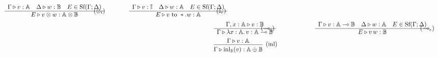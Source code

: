 \begin{figure} [H]
{\begin{equation*}
\begin{split}
\begin{aligned}
\begin{minipage}[t]{0.3\textwidth}
$\begin{array}{c}
     \Gamma \triangleright v: \mathbb{A} \quad  \Delta \triangleright w: \mathbb{B}  \quad E \in \text{Sf}(\Gamma;\Delta) \\
    \hline
   E \triangleright v \otimes w: \mathbb{A} \otimes \mathbb{B} 
\end{array}
$
\end{minipage}
\hspace{41pt} (\otimes_{i}) 
 \hspace{39pt}
 \begin{minipage}[t]{0.3\textwidth}
$\begin{array}{c}
     \Gamma \triangleright v: \mathbb{I} \quad  \Delta \triangleright w: \mathbb{A}  \quad E \in \text{Sf}(\Gamma;\Delta)  \\
    \hline
   E \triangleright v \text { to } *.w: \mathbb{A}  
\end{array}
$ \end{minipage}
\hspace{38pt} (\mathbb{I}_{e}) \\
& \hspace{-20pt}
\begin{minipage}[t]{0.3\textwidth}
$\begin{array}{c}
     \Gamma,x:\mathbb{A} \triangleright v: \mathbb{B} \\
    \hline
   \Gamma \triangleright \lambda x:\mathbb{A} . \, v: \mathbb{A} \multimap \mathbb{B} 
\end{array}
$
\end{minipage}
\hspace{-27pt} (\multimap_{i}) 
 \hspace{66pt}
 \begin{minipage}[t]{0.3\textwidth}
$\begin{array}{c}
     \Gamma \triangleright v: \mathbb{A} \multimap \mathbb{B} \quad  \Delta \triangleright w: \mathbb{A}  \quad E \in \text{Sf}(\Gamma;\Delta)  \\
    \hline
   E \triangleright v \, w: \mathbb{B}  
\end{array}
$ \end{minipage}
\hspace{67pt} (\multimap_{e}) \\
& \hspace{-20pt}
    \begin{prooftree}
        \hypo{\Gamma \vljud v: \typeA}
        \infer1[(inl)]{\Gamma \vljud \inl_{\typeB}(v): \typeA \oplus \typeB}

\end{prooftree}
\end{aligned}
\end{split}
\end{equation*}}
\end{figure}
